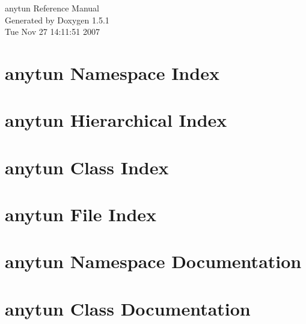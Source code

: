 \documentclass[a4paper]{book}
\begin{document}
\begin{titlepage}
\vspace*{7cm}
\begin{center}
{\Large anytun Reference Manual}\\
\vspace*{1cm}
{\large Generated by Doxygen 1.5.1}\\
\vspace*{0.5cm}
{\small Tue Nov 27 14:11:51 2007}\\
\end{center}
\end{titlepage}
\clearemptydoublepage
{}
\tableofcontents
\clearemptydoublepage
{}
\chapter{anytun Namespace Index}

\chapter{anytun Hierarchical Index}

\chapter{anytun Class Index}

\chapter{anytun File Index}

\chapter{anytun Namespace Documentation}



\chapter{anytun Class Documentation}










































\end{document}
